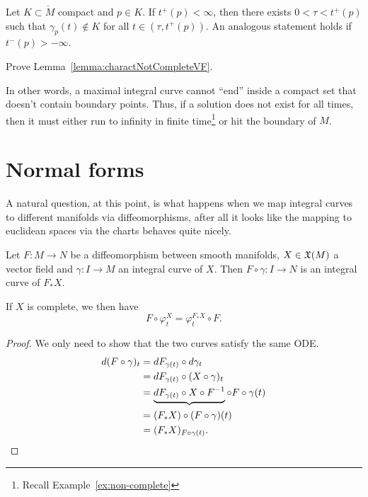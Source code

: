 \begin{lemma}\label{lemma:charactNotCompleteVF}
  Let $K\subset \mathring M$ compact and $p\in K$.
  If $t^+(p) < \infty$, then there exists $0<\tau<t^+(p)$ such that $\gamma_p(t)\not\in K$ for all $t\in (\tau, t^+(p))$.
  An analogous statement holds if $t^-(p) > -\infty$.
\end{lemma}

\begin{exercise}
  Prove Lemma~\ref{lemma:charactNotCompleteVF}.
\end{exercise}

In other words, a maximal integral curve cannot ``end'' inside a compact set that doesn't contain boundary points.
Thus, if a solution does not exist for all times, then it must either run to infinity in finite time\footnote{Recall Example~\ref{ex:non-complete}} or hit the boundary of $M$.

\section{Normal forms}

A natural question, at this point, is what happens when we map integral curves to different manifolds via diffeomorphisms, after all it looks like the mapping to euclidean spaces via the charts behaves quite nicely.

\begin{proposition}\label{prop:conjpfX}
  Let $F: M \to N$ be a diffeomorphism between smooth manifolds, $X\in\mathfrak{X}(M)$ a vector field and $\gamma:I\to M$ an integral curve of $X$. Then $F\circ\gamma : I \to N$ is an integral curve of $F_* X$.

  If $X$ is complete, we then have
  \begin{equation}
    F\circ\varphi_t^X = \varphi_t^{F_* X}\circ F.
  \end{equation}
\end{proposition}
\begin{proof}
  We only need to show that the two curves satisfy the same ODE.
  \begin{align*}
    d(F\circ \gamma)_t
     & = dF_{\gamma(t)} \circ d\gamma_t                                                \\
     & = dF_{\gamma(t)} \circ (X \circ \gamma)_t                                       \\
     & = \LaTeXunderbrace{dF_{\gamma(t)} \circ X \circ F^{-1}} \circ F \circ \gamma(t) \\
     & = (F_* X) \circ (F\circ \gamma)(t)                                              \\
     & = (F_* X)_{F\circ\gamma(t)}.
  \end{align*}
\end{proof}

